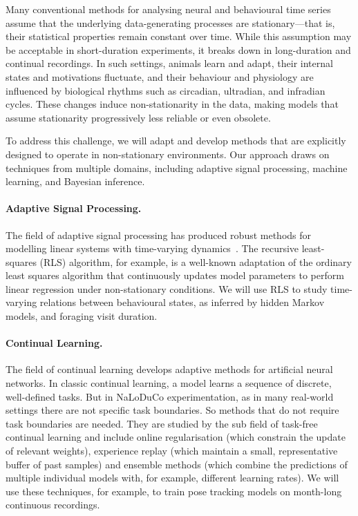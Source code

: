 \label{sec:non-stationarity}

Many conventional methods for analysing neural and behavioural time series
assume that the underlying data-generating processes are stationary—that is,
their statistical properties remain constant over time. While this assumption
may be acceptable in short-duration experiments, it breaks down in
long-duration and continual recordings. In such settings, animals
learn and adapt, their internal states and motivations fluctuate, and their
behaviour and physiology are influenced by biological rhythms such as circadian,
ultradian, and infradian cycles. These changes induce non-stationarity in the
data, making models that assume stationarity progressively less reliable or
even obsolete.

To address this challenge, we will adapt and develop methods that are
explicitly designed to operate in non-stationary environments. Our approach
draws on techniques from multiple domains, including adaptive signal
processing, machine learning, and Bayesian inference.

\paragraph{Adaptive Signal Processing.}

The field of adaptive signal processing has produced robust methods for
modelling linear systems with time-varying dynamics~\citep{haykin02}.
%
The recursive least-squares (RLS) algorithm, for example, is a well-known
adaptation of the ordinary least squares algorithm that continuously updates
model parameters to perform linear regression under non-stationary conditions.
%
We will use RLS to study time-varying relations between
behavioural states, as inferred by hidden Markov models, and foraging visit
duration.

\paragraph{Continual Learning.}

The field of continual learning develops adaptive methods for
artificial neural networks.  In classic continual learning, a model learns a
sequence of discrete, well-defined tasks.  But in NaLoDuCo experimentation, as
in many real-world settings there are not specific task boundaries. So methods
that do not require task boundaries are needed. They are studied by the
sub field of task-free continual learning and include online
regularisation (which constrain the update of relevant weights), experience
replay (which maintain a small, representative buffer of past samples) and
ensemble methods (which combine the predictions of multiple individual models
with, for example, different learning rates).
%
We will use these techniques, for example, to train pose tracking models on
month-long continuous recordings.

